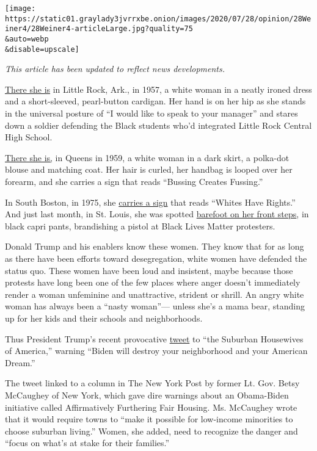 \texttt{[image: https://static01.graylady3jvrrxbe.onion/images/2020/07/28/opinion/28Weiner4/28Weiner4-articleLarge.jpg?quality=75\\\&auto=webp\\\&disable=upscale]}

\emph{This article has been updated to reflect news developments.}

\href{https://artsandculture.google.com/asset/little-rock-integration/jwEdz9Na2Fy0tQ}{There
she is} in Little Rock, Ark., in 1957, a white woman in a neatly ironed
dress and a short-sleeved, pearl-button cardigan. Her hand is on her hip
as she stands in the universal posture of ``I would like to speak to
your manager'' and stares down a soldier defending the Black students
who'd integrated Little Rock Central High School.

\href{https://images.app.goo.gl/KRH9N5YB1oSNuEum8}{There she is,} in
Queens in 1959, a white woman in a dark skirt, a polka-dot blouse and
matching coat. Her hair is curled, her handbag is looped over her
forearm, and she carries a sign that reads ``Bussing Creates Fussing.''

In South Boston, in 1975, she
\href{https://www.flickr.com/photos/boston_public_library/6326362205}{carries
a sign} that reads ``Whites Have Rights.'' And just last month, in St.
Louis, she was spotted
\href{https://www.washingtonpost.com/nation/2020/07/20/st-louis-couple-who-aimed-guns-protesters-charged-with-felony-weapons-count/}{barefoot
on her front steps}, in black capri pants, brandishing a pistol at Black
Lives Matter protesters.

Donald Trump and his enablers know these women. They know that for as
long as there have been efforts toward desegregation, white women have
defended the status quo. These women have been loud and insistent, maybe
because those protests have long been one of the few places where anger
doesn't immediately render a woman unfeminine and unattractive, strident
or shrill. An angry white woman has always been a ``nasty woman''---
unless she's a mama bear, standing up for her kids and their schools and
neighborhoods.

Thus President Trump's recent provocative
\href{https://twitter.com/realDonaldTrump/status/1286372175117791236?s=20}{tweet}
to ``the Suburban Housewives of America,'' warning ``Biden will destroy
your neighborhood and your American Dream.''

The tweet linked to a column in The New York Post by former Lt. Gov.
Betsy McCaughey of New York, which gave dire warnings about an
Obama-Biden initiative called Affirmatively Furthering Fair Housing. Ms.
McCaughey wrote that it would require towns to ``make it possible for
low-income minorities to choose suburban living.'' Women, she added,
need to recognize the danger and ``focus on what's at stake for their
families.''


